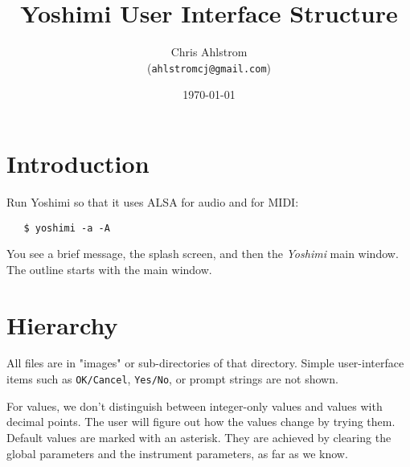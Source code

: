 \documentclass[
 11pt,
 twoside,
 a4paper,
 headinclude,
 footinclude,
 final                                 %
]{article}
\begin{document}
\title{Yoshimi User Interface Structure}
\author{Chris Ahlstrom\\
   (\texttt{ahlstromcj@gmail.com})}
\date{\today}
\maketitle



\setlength{\parindent}{0pt}


\section{Introduction}

Run Yoshimi so that it uses ALSA for audio and for MIDI:

\begin{verbatim}
   $ yoshimi -a -A
\end{verbatim}

You see a brief message, the splash screen, and then the
\textsl{Yoshimi} main window. The outline starts with the main window.

\section{Hierarchy}


All files are in "images" or sub-directories of that directory.
Simple user-interface items such as 
\texttt{OK/Cancel}, \texttt{Yes/No}, or prompt strings
are not shown.

For values, we don't distinguish between integer-only values and values with
decimal points.  The user will figure out how the values change by trying
them.  Default values are marked with an asterisk.  They are achieved
by clearing the global parameters and the instrument parameters, as far as
we know.
\end{document}

